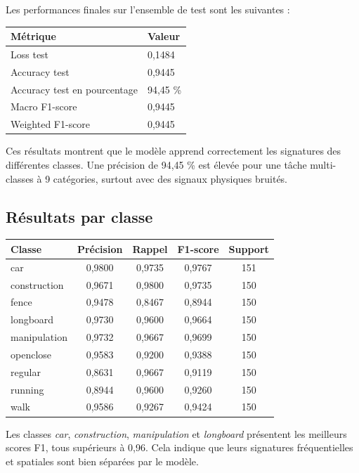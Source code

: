 \documentclass[10pt,a4paper]{article}
\begin{document}
Les performances finales sur l'ensemble de test sont les suivantes :

\begin{center}
\begin{tabular}{ll}
\toprule
\textbf{Métrique} & \textbf{Valeur} \\
\midrule
Loss test & 0,1484 \\
Accuracy test & 0,9445 \\
Accuracy test en pourcentage & 94,45 \% \\
Macro F1-score & 0,9445 \\
Weighted F1-score & 0,9445 \\
\bottomrule
\end{tabular}
\end{center}

Ces résultats montrent que le modèle apprend correctement les signatures des différentes classes. Une
précision de 94,45 \% est élevée pour une tâche multi-classes à 9 catégories, surtout avec des signaux
physiques bruités.

\subsection{Résultats par classe}

\begin{center}
\begin{tabular}{lcccc}
\toprule
\textbf{Classe} & \textbf{Précision} & \textbf{Rappel} & \textbf{F1-score} & \textbf{Support} \\
\midrule
car & 0,9800 & 0,9735 & 0,9767 & 151 \\
construction & 0,9671 & 0,9800 & 0,9735 & 150 \\
fence & 0,9478 & 0,8467 & 0,8944 & 150 \\
longboard & 0,9730 & 0,9600 & 0,9664 & 150 \\
manipulation & 0,9732 & 0,9667 & 0,9699 & 150 \\
openclose & 0,9583 & 0,9200 & 0,9388 & 150 \\
regular & 0,8631 & 0,9667 & 0,9119 & 150 \\
running & 0,8944 & 0,9600 & 0,9260 & 150 \\
walk & 0,9586 & 0,9267 & 0,9424 & 150 \\
\bottomrule
\end{tabular}
\end{center}

Les classes \textit{car}, \textit{construction}, \textit{manipulation} et \textit{longboard} présentent les
meilleurs scores F1, tous supérieurs à 0,96. Cela indique que leurs signatures fréquentielles et spatiales
sont bien séparées par le modèle.
\end{document}
